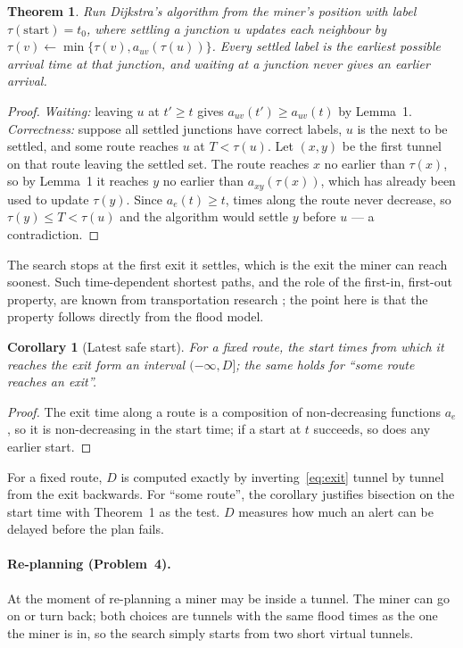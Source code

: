 \documentclass[11pt,a4paper]{article}
\newtheorem{theorem}{Theorem}
\newtheorem{corollary}{Corollary}
\theoremstyle{remark}
\begin{document}
\begin{theorem}
Run Dijkstra's algorithm from the miner's position with label $\tau(\text{start}) = t_0$, where settling a junction $u$ updates each neighbour by $\tau(v) \gets \min\{\tau(v), a_{uv}(\tau(u))\}$. Every settled label is the earliest possible arrival time at that junction, and waiting at a junction never gives an earlier arrival.
\end{theorem}
\begin{proof}
\emph{Waiting:} leaving $u$ at $t' \ge t$ gives $a_{uv}(t') \ge a_{uv}(t)$ by Lemma~1.
\emph{Correctness:} suppose all settled junctions have correct labels, $u$ is the next to be settled, and some route reaches $u$ at $T < \tau(u)$. Let $(x,y)$ be the first tunnel on that route leaving the settled set. The route reaches $x$ no earlier than $\tau(x)$, so by Lemma~1 it reaches $y$ no earlier than $a_{xy}(\tau(x))$, which has already been used to update $\tau(y)$. Since $a_e(t) \ge t$, times along the route never decrease, so $\tau(y) \le T < \tau(u)$ and the algorithm would settle $y$ before $u$ --- a contradiction.
\end{proof}

The search stops at the first exit it settles, which is the exit the miner can reach soonest. Such time-dependent shortest paths, and the role of the first-in, first-out property, are known from transportation research \cite{dreyfus, kaufman, orda}; the point here is that the property follows directly from the flood model.

\begin{corollary}[Latest safe start]
For a fixed route, the start times from which it reaches the exit form an interval $(-\infty, D]$; the same holds for ``some route reaches an exit''.
\end{corollary}
\begin{proof}
The exit time along a route is a composition of non-decreasing functions $a_e$, so it is non-decreasing in the start time; if a start at $t$ succeeds, so does any earlier start.
\end{proof}

For a fixed route, $D$ is computed exactly by inverting~\eqref{eq:exit} tunnel by tunnel from the exit backwards. For ``some route'', the corollary justifies bisection on the start time with Theorem~1 as the test. $D$ measures how much an alert can be delayed before the plan fails.

\paragraph{Re-planning (Problem~4).} At the moment of re-planning a miner may be inside a tunnel. The miner can go on or turn back; both choices are tunnels with the same flood times as the one the miner is in, so the search simply starts from two short virtual tunnels.
\end{document}
